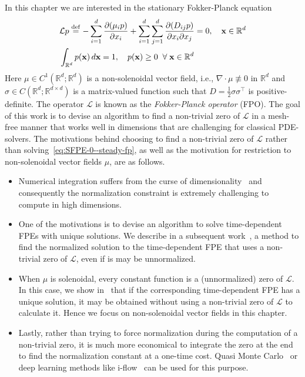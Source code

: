 In this chapter we are interested in the stationary 
Fokker-Planck equation
\begin{align}
&\mathcal L p \stackrel{\rm def}{=}
  -\sum_{i=1}^d\frac{\partial(\mu_ip)}{\partial x_i} + \sum_{i=1}^d\sum_{j=1}^d\frac{\partial (D_{ij}p)}{\partial x_i\partial x_j}=0,\quad\mathbf x\in\mathbb R^d \label{eq:SFPE-0--steady-fp}\\
  &\int_{\mathbb R^d}p(\mathbf x)\,d\mathbf x = 1,\quad p(\mathbf x)\ge0\;\;\forall\;\mathbf x\in\mathbb R^d \nonumber
\end{align}
Here $\mu\in C^1(\mathbb R^d; \mathbb R^d)$ is a non-solenoidal vector field, i.e., $\nabla\cdot\mu\not\equiv0$ in $\mathbb R^d$ and $\sigma\in C(\mathbb R^d; \mathbb R^{d\times d})$ is a matrix-valued function such that $D=\frac{1}{2}\sigma\sigma^\top$ is positive-definite.
The operator $\mathcal L$ is known as the \textit{Fokker-Planck operator} (FPO). The goal of this work is to devise an algorithm to find a non-trivial zero of  $\mathcal L$ in a mesh-free manner that works well in dimensions that are challenging for classical PDE-solvers. The motivations behind choosing to find a non-trivial zero of $\mathcal L$ rather than solving~\eqref{eq:SFPE-0--steady-fp}, as well as the motivation for restriction to non-solenoidal vector fields $\mu$, are as follows. 
\begin{itemize}
    \item Numerical integration suffers from the curse of dimensionality~\cite{hinrichs2014curse} and consequently the normalization constraint is extremely challenging to compute in high dimensions.
    \item One of the motivations is to devise an algorithm to solve time-dependent FPEs with unique solutions. We describe in a subsequent work~\cite{dynamicfp2024}, a method to find the normalized solution to the time-dependent FPE that uses a non-trivial zero of $\mathcal L$, even if is may be unnormalized.
    \item When $\mu$ is solenoidal, every constant function is a (unnormalized) zero of $\mathcal L$. In this case, we show in~\cite{dynamicfp2024} that if the corresponding time-dependent FPE has a unique solution, it may be obtained without using a non-trivial zero of $\mathcal L$ to calculate it. Hence we focus on non-solenoidal vector fields in this chapter.
    \item Lastly, rather than trying to force normalization during the computation of a non-trivial zero, it is much more economical to integrate the zero at the end to find the normalization constant at a one-time cost. Quasi Monte Carlo~\cite{leobacher2014introduction} or deep learning methods like i-flow~\cite{gao2020flow} can be used for this purpose. 
\end{itemize}
 

